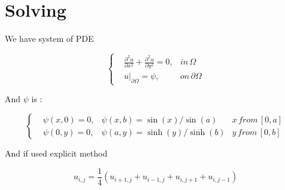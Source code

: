 

\section*{Solving}

We have system of PDE

\begin{equation}
    \left\{
    \begin{matrix}
    &\frac{\partial^2 u}{\partial x^2} + \frac{\partial^2 u}{\partial y^2} = 0, & in \,  \Omega \, \\
    &u|_{\partial\Omega} = \psi, & on \, \partial \Omega 
    \end{matrix}
    \right.
\end{equation}

And $\psi$ is :

\begin{equation}
\left\{
\begin{matrix}
    &\psi(x,0) = 0, & \psi(x,b) = \sin(x)/\sin(a) & x\, from\, [0,a] \\
    &\psi(0,y) = 0 , & \psi(a,y) = \sinh(y) / \sinh(b) & y\, from \, [0,b]
    \end{matrix}
    \right.
\end{equation}

And if used explicit method

\begin{equation}
    u_{i, j} = \frac{1}{4} (u_{i+1,j} + u_{i-1,j} + u_{i,j+1} + u_{i,j-1}) 
\end{equation}

\begin{figure}[h!]
\end{figure}


